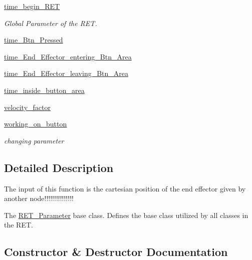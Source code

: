 \begin{DoxyCompactItemize}
\item 
\hyperlink{classRET__Parameter_1_1RET__Parameter_a0fc681ced6250a0d860270ba7db63e5a}{time\+\_\+begin\+\_\+\+R\+ET}
\begin{DoxyCompactList}\small\item\em Global Parameter of the R\+ET. \end{DoxyCompactList}\item 
\hyperlink{classRET__Parameter_1_1RET__Parameter_aeb9535b7bbd9a71cd537b64de9a114f2}{time\+\_\+\+Btn\+\_\+\+Pressed}
\item 
\hyperlink{classRET__Parameter_1_1RET__Parameter_a1dbe7829bfc697ea985c80c74990e641}{time\+\_\+\+End\+\_\+\+Effector\+\_\+entering\+\_\+\+Btn\+\_\+\+Area}
\item 
\hyperlink{classRET__Parameter_1_1RET__Parameter_ab4ac422d38097f009ddb2c18a4172740}{time\+\_\+\+End\+\_\+\+Effector\+\_\+leaving\+\_\+\+Btn\+\_\+\+Area}
\item 
\hyperlink{classRET__Parameter_1_1RET__Parameter_ac753e4e4f67db35f3e3a49d6e329cd1a}{time\+\_\+inside\+\_\+button\+\_\+area}
\item 
\hyperlink{classRET__Parameter_1_1RET__Parameter_a082e6ba9804a6094336b4c267262460e}{velocity\+\_\+factor}
\item 
\hyperlink{classRET__Parameter_1_1RET__Parameter_a96204c1a4417d5a3a980521f8a66a1fa}{working\+\_\+on\+\_\+button}
\begin{DoxyCompactList}\small\item\em changing parameter \end{DoxyCompactList}\end{DoxyCompactItemize}


\subsection{Detailed Description}
The input of this function is the cartesian position of the end effector given by another node!!!!!!!!!!!!!!! 

The \hyperlink{classRET__Parameter_1_1RET__Parameter}{R\+E\+T\+\_\+\+Parameter} base class. Defines the base class utilized by all classes in the R\+ET. 

\subsection{Constructor \& Destructor Documentation}
\mbox{\label{classRET__Parameter_1_1RET__Parameter_acaff5a3a7b875ffce45f9c16a3f191d6}} 
